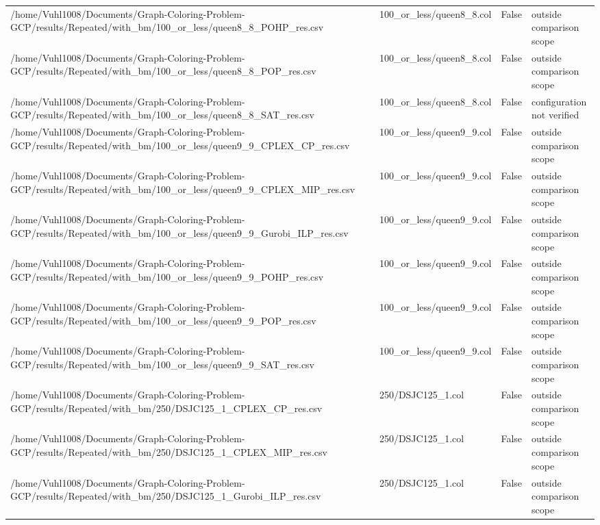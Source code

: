 \begin{table}[htbp]
\begin{tabular}{llll}
/home/Vuhl1008/Documents/Graph-Coloring-Problem-GCP/results/Repeated/with\_bm/100\_or\_less/queen8\_8\_POHP\_res.csv & 100\_or\_less/queen8\_8.col & False & outside comparison scope \\
/home/Vuhl1008/Documents/Graph-Coloring-Problem-GCP/results/Repeated/with\_bm/100\_or\_less/queen8\_8\_POP\_res.csv & 100\_or\_less/queen8\_8.col & False & outside comparison scope \\
/home/Vuhl1008/Documents/Graph-Coloring-Problem-GCP/results/Repeated/with\_bm/100\_or\_less/queen8\_8\_SAT\_res.csv & 100\_or\_less/queen8\_8.col & False & configuration not verified \\
/home/Vuhl1008/Documents/Graph-Coloring-Problem-GCP/results/Repeated/with\_bm/100\_or\_less/queen9\_9\_CPLEX\_CP\_res.csv & 100\_or\_less/queen9\_9.col & False & outside comparison scope \\
/home/Vuhl1008/Documents/Graph-Coloring-Problem-GCP/results/Repeated/with\_bm/100\_or\_less/queen9\_9\_CPLEX\_MIP\_res.csv & 100\_or\_less/queen9\_9.col & False & outside comparison scope \\
/home/Vuhl1008/Documents/Graph-Coloring-Problem-GCP/results/Repeated/with\_bm/100\_or\_less/queen9\_9\_Gurobi\_ILP\_res.csv & 100\_or\_less/queen9\_9.col & False & outside comparison scope \\
/home/Vuhl1008/Documents/Graph-Coloring-Problem-GCP/results/Repeated/with\_bm/100\_or\_less/queen9\_9\_POHP\_res.csv & 100\_or\_less/queen9\_9.col & False & outside comparison scope \\
/home/Vuhl1008/Documents/Graph-Coloring-Problem-GCP/results/Repeated/with\_bm/100\_or\_less/queen9\_9\_POP\_res.csv & 100\_or\_less/queen9\_9.col & False & outside comparison scope \\
/home/Vuhl1008/Documents/Graph-Coloring-Problem-GCP/results/Repeated/with\_bm/100\_or\_less/queen9\_9\_SAT\_res.csv & 100\_or\_less/queen9\_9.col & False & outside comparison scope \\
/home/Vuhl1008/Documents/Graph-Coloring-Problem-GCP/results/Repeated/with\_bm/250/DSJC125\_1\_CPLEX\_CP\_res.csv & 250/DSJC125\_1.col & False & outside comparison scope \\
/home/Vuhl1008/Documents/Graph-Coloring-Problem-GCP/results/Repeated/with\_bm/250/DSJC125\_1\_CPLEX\_MIP\_res.csv & 250/DSJC125\_1.col & False & outside comparison scope \\
/home/Vuhl1008/Documents/Graph-Coloring-Problem-GCP/results/Repeated/with\_bm/250/DSJC125\_1\_Gurobi\_ILP\_res.csv & 250/DSJC125\_1.col & False & outside comparison scope \\

\end{tabular}
\end{table}
